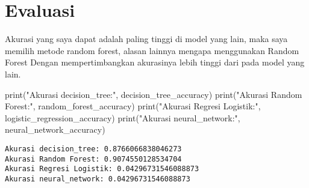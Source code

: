 \documentclass[
  letterpaper,
]{krantz}
\makeatletter
\newenvironment{Shaded}{\begin{snugshade}}{\end{snugshade}}
\newcommand{\BuiltInTok}[1]{\textcolor[rgb]{0.00,0.23,0.31}{#1}}
\newcommand{\NormalTok}[1]{\textcolor[rgb]{0.00,0.23,0.31}{#1}}
\newcommand{\StringTok}[1]{\textcolor[rgb]{0.13,0.47,0.30}{#1}}
\newenvironment{kframe}{%
\medskip{}
\setlength{\fboxsep}{.8em}
 \def\at@end@of@kframe{}%
 \ifinner\ifhmode%
  \def\at@end@of@kframe{\end{minipage}}%
  \begin{minipage}{\columnwidth}%
 \fi\fi%
 \def\FrameCommand##1{\hskip\@totalleftmargin \hskip-\fboxsep
 \colorbox{shadecolor}{##1}\hskip-\fboxsep
     \hskip-\linewidth \hskip-\@totalleftmargin \hskip\columnwidth}%
 \MakeFramed {\advance\hsize-\width
   \@totalleftmargin\z@ \linewidth\hsize
   \@setminipage}}%
 {\par\unskip\endMakeFramed%
 \at@end@of@kframe}
\renewenvironment{Shaded}{\begin{kframe}}{\end{kframe}}
\makeatother
\begin{document}
\hypertarget{evaluasi}{%
\section{Evaluasi}\label{evaluasi}}

Akurasi yang saya dapat adalah paling tinggi di model yang lain, maka
saya memilih metode random forest, alasan lainnya mengapa menggunakan
Random Forest Dengan mempertimbangkan akurasinya lebih tinggi dari pada
model yang lain.

\begin{Shaded}
\begin{Highlighting}[]
\BuiltInTok{print}\NormalTok{(}\StringTok{"Akurasi decision\_tree:"}\NormalTok{, decision\_tree\_accuracy)}
\BuiltInTok{print}\NormalTok{(}\StringTok{"Akurasi Random Forest:"}\NormalTok{, random\_forest\_accuracy)}
\BuiltInTok{print}\NormalTok{(}\StringTok{"Akurasi Regresi Logistik:"}\NormalTok{, logistic\_regression\_accuracy)}
\BuiltInTok{print}\NormalTok{(}\StringTok{"Akurasi neural\_network:"}\NormalTok{, neural\_network\_accuracy)}
\end{Highlighting}
\end{Shaded}

\begin{verbatim}
Akurasi decision_tree: 0.8766066838046273
Akurasi Random Forest: 0.9074550128534704
Akurasi Regresi Logistik: 0.04296731546088873
Akurasi neural_network: 0.04296731546088873
\end{verbatim}
\end{document}
